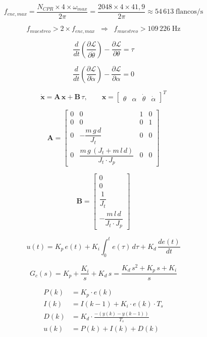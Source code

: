 \documentclass[12pt]{article}
\begin{document}
\[ f_{enc,max} = \frac{N_{CPR} \times 4 \times \omega_{max}}{2\pi} = \frac{2048 \times 4 \times 41{,}9}{2\pi} \approx 54\,613 \;\text{flancos/s} \]

\[ f_{muestreo} > 2 \times f_{enc,max} \;\;\Longrightarrow\;\; f_{muestreo} > 109\,226\;\text{Hz} \]

\[ \frac{d}{dt}\left(\frac{\partial \mathcal{L}}{\partial \dot{\theta}}\right) - \frac{\partial \mathcal{L}}{\partial \theta} = \tau \]

\[ \frac{d}{dt}\left(\frac{\partial \mathcal{L}}{\partial \dot{\alpha}}\right) - \frac{\partial \mathcal{L}}{\partial \alpha} = 0 \]

\[ \dot{\mathbf{x}} = \mathbf{A} \, \mathbf{x} + \mathbf{B} \, \tau, \qquad \mathbf{x} = \begin{bmatrix} \theta & \alpha & \dot{\theta} & \dot{\alpha} \end{bmatrix}^T \]

\[ \mathbf{A} = \begin{bmatrix} 0 & 0 & 1 & 0 \\ 0 & 0 & 0 & 1 \\[4pt] 0 & -\dfrac{m \, g \, d}{J_t} & 0 & 0 \\[10pt] 0 & \dfrac{m \, g \, (J_t + m \, l \, d)}{J_t \cdot J_p} & 0 & 0 \end{bmatrix} \]

\[ \mathbf{B} = \begin{bmatrix} 0 \\[4pt] 0 \\[4pt] \dfrac{1}{J_t} \\[10pt] -\dfrac{m \, l \, d}{J_t \cdot J_p} \end{bmatrix} \]

\[ u(t) = K_p \, e(t) + K_i \int_0^t e(\tau) \, d\tau + K_d \, \frac{de(t)}{dt} \]

\[ G_c(s) = K_p + \frac{K_i}{s} + K_d \, s = \frac{K_d \, s^2 + K_p \, s + K_i}{s} \]

\[ \begin{aligned} P(k) &= K_p \cdot e(k) \\[4pt] I(k) &= I(k-1) + K_i \cdot e(k) \cdot T_s \\[4pt] D(k) &= K_d \cdot \frac{-(y(k) - y(k-1))}{T_s} \\[4pt] u(k) &= P(k) + I(k) + D(k) \end{aligned} \]
\end{document}
